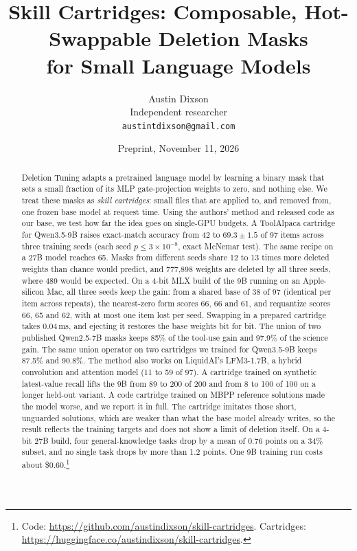 \documentclass[11pt]{article}
\title{Skill Cartridges: Composable, Hot-Swappable Deletion Masks\\for Small Language Models}
\author{Austin Dixson\\Independent researcher\\\texttt{austintdixson@gmail.com}}
\date{Preprint, November 11, 2026}
\begin{document}
\sloppy
\maketitle

\begin{abstract}
Deletion Tuning \citep{lu2026deleting} adapts a pretrained language model by learning a binary mask that sets a small fraction of its MLP gate-projection weights to zero, and nothing else. We treat these masks as \emph{skill cartridges}: small files that are applied to, and removed from, one frozen base model at request time. Using the authors' method and released code as our base, we test how far the idea goes on single-GPU budgets. A ToolAlpaca cartridge for Qwen3.5-9B raises exact-match accuracy from 42 to $69.3 \pm 1.5$ of 97 items across three training seeds (each seed $p \le 3\times10^{-8}$, exact McNemar test). The same recipe on a 27B model reaches 65. Masks from different seeds share 12 to 13 times more deleted weights than chance would predict, and 777,898 weights are deleted by all three seeds, where 489 would be expected. On a 4-bit MLX build of the 9B running on an Apple-silicon Mac, all three seeds keep the gain: from a shared base of 38 of 97 (identical per item across repeats), the nearest-zero form scores 66, 66 and 61, and requantize scores 66, 65 and 62, with at most one item lost per seed. Swapping in a prepared cartridge takes 0.04\,ms, and ejecting it restores the base weights bit for bit. The union of two published Qwen2.5-7B masks keeps 85\% of the tool-use gain and 97.9\% of the science gain. The same union operator on two cartridges we trained for Qwen3.5-9B keeps 87.5\% and 90.8\%. The method also works on LiquidAI's LFM3-1.7B, a hybrid convolution and attention model (11 to 59 of 97). A cartridge trained on synthetic latest-value recall lifts the 9B from 89 to 200 of 200 and from 8 to 100 of 100 on a longer held-out variant. A code cartridge trained on MBPP reference solutions made the model worse, and we report it in full. The cartridge imitates those short, unguarded solutions, which are weaker than what the base model already writes, so the result reflects the training targets and does not show a limit of deletion itself. On a 4-bit 27B build, four general-knowledge tasks drop by a mean of 0.76 points on a 34\% subset, and no single task drops by more than 1.2 points. One 9B training run costs about \$0.60.\footnote{Code: \url{https://github.com/austindixson/skill-cartridges}. Cartridges: \url{https://huggingface.co/austindixson/skill-cartridges}.}
\end{abstract}
\end{document}
